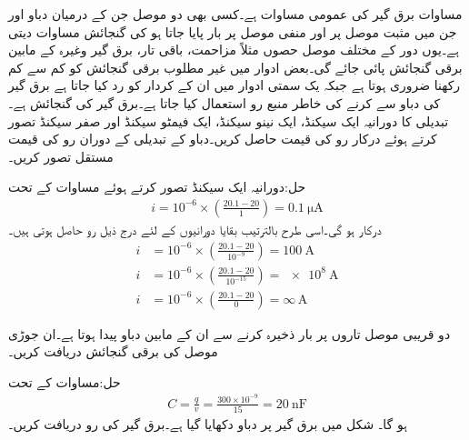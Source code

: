 مساوات  برق گیر کی عمومی مساوات ہے۔کسی بھی دو موصل جن کے درمیان دباو  اور جن میں مثبت موصل پر  اور منفی موصل پر  بار پایا جاتا ہو کی گنجائش مساوات  دیتی ہے۔یوں دور کے مختلف موصل حصوں مثلاً مزاحمت، باقی تار، برق گیر وغیرہ کے مابین  برقی گنجائش پائی جائے گی۔بعض ادوار میں غیر مطلوب برقی گنجائش کو کم سے کم رکھنا ضروری ہوتا ہے جبکہ یک سمتی ادوار میں ان کے کردار کو رد کیا جاتا ہے
برق گیر کی دباو  سے  کرنے کی خاطر منبع رو استعمال کیا جاتا ہے۔برق گیر کی گنجائش  ہے۔تبدیلی کا دورانیہ ایک سیکنڈ، ایک نینو سیکنڈ، ایک فیمٹو سیکنڈ اور صفر سیکنڈ تصور کرتے ہوئے درکار رو کی قیمت حاصل کریں۔دباو کے تبدیلی کے دوران رو کی قیمت مستقل تصور کریں۔

حل:دورانیہ ایک سیکنڈ تصور کرتے ہوئے مساوات    کے تحت
\begin{align*}
i=10^{-6} \times \left(\frac{20.1-20}{1}\right)=\SI{0.1}{\micro\ampere}
\end{align*}
درکار ہو گی۔اسی طرح بالترتیب بقایا دورانیوں کے لئے درج ذیل رو حاصل ہوتی ہیں۔
\begin{align*}
i&=10^{-6} \times \left(\frac{20.1-20}{10^{-9}}\right)=\SI{100}{\ampere}\\
i&=10^{-6} \times \left(\frac{20.1-20}{10^{-15}}\right)=\SI{e8}{\ampere}\\
i&=10^{-6} \times \left(\frac{20.1-20}{0}\right)=\infty\, \si{\ampere}
\end{align*}


دو  قریبی موصل تاروں پر  بار ذخیرہ کرنے سے ان کے مابین  دباو پیدا ہوتا ہے۔ان جوڑی موصل کی برقی گنجائش دریافت کریں۔

حل:مساوات  کے تحت
\begin{align*}
C=\frac{q}{v}=\frac{300 \times 10^{-9}}{15}=\SI{20}{\nano\farad}
\end{align*}
ہو گا۔ 
شکل میں  برق گیر پر دباو دکھایا گیا ہے۔برق گیر کی رو دریافت کریں۔

